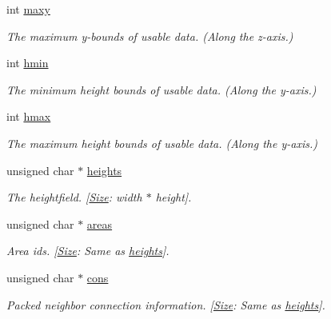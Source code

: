 \begin{DoxyCompactItemize}
int \hyperlink{structrcHeightfieldLayer_ad697fc4a8a65c2b1ef1f976097ee2b3f}{maxy}
\begin{DoxyCompactList}\small\item\em The maximum y-\/bounds of usable data. (Along the z-\/axis.) \end{DoxyCompactList}\item 
\mbox{\label{structrcHeightfieldLayer_a6ddd970ccf1cd15048ac535f9f75d083}} 
int \hyperlink{structrcHeightfieldLayer_a6ddd970ccf1cd15048ac535f9f75d083}{hmin}
\begin{DoxyCompactList}\small\item\em The minimum height bounds of usable data. (Along the y-\/axis.) \end{DoxyCompactList}\item 
\mbox{\label{structrcHeightfieldLayer_a95365db6dde274d1722aec90ade7a8c8}} 
int \hyperlink{structrcHeightfieldLayer_a95365db6dde274d1722aec90ade7a8c8}{hmax}
\begin{DoxyCompactList}\small\item\em The maximum height bounds of usable data. (Along the y-\/axis.) \end{DoxyCompactList}\item 
\mbox{\label{structrcHeightfieldLayer_a47c7038b79f34d78ce750e48dc6e85bf}} 
unsigned char $\ast$ \hyperlink{structrcHeightfieldLayer_a47c7038b79f34d78ce750e48dc6e85bf}{heights}
\begin{DoxyCompactList}\small\item\em The heightfield. \mbox{[}\hyperlink{classSize}{Size}\+: width $\ast$ height\mbox{]}. \end{DoxyCompactList}\item 
\mbox{\label{structrcHeightfieldLayer_ab0a1ac3b3b73b7cf9a964294d5a217ff}} 
unsigned char $\ast$ \hyperlink{structrcHeightfieldLayer_ab0a1ac3b3b73b7cf9a964294d5a217ff}{areas}
\begin{DoxyCompactList}\small\item\em Area ids. \mbox{[}\hyperlink{classSize}{Size}\+: Same as \hyperlink{structrcHeightfieldLayer_a47c7038b79f34d78ce750e48dc6e85bf}{heights}\mbox{]}. \end{DoxyCompactList}\item 
\mbox{\label{structrcHeightfieldLayer_a61419755f56398e06d299286a0b582b3}} 
unsigned char $\ast$ \hyperlink{structrcHeightfieldLayer_a61419755f56398e06d299286a0b582b3}{cons}
\begin{DoxyCompactList}\small\item\em Packed neighbor connection information. \mbox{[}\hyperlink{classSize}{Size}\+: Same as \hyperlink{structrcHeightfieldLayer_a47c7038b79f34d78ce750e48dc6e85bf}{heights}\mbox{]}. \end{DoxyCompactList}\end{DoxyCompactItemize}



